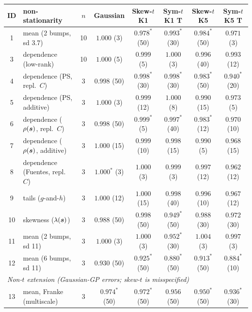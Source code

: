\setlength{\tabcolsep}{3.7pt}
\begin{tabular}{clcccccc}
\toprule
ID & non-stationarity & $n$ & Gaussian & Skew-$t$ K1 & Sym-$t$ K1 T & Skew-$t$ K5 & Sym-$t$ K5 T \\
\midrule
1 & mean (2 bumps, sd 3.7) & 10 & $1.000$ {\tiny(3)} & $0.978^{*}$ {\tiny(50)} & $0.993^{*}$ {\tiny(30)} & $0.984^{*}$ {\tiny(50)} & $0.971$ {\tiny(3)} \\
3 & dependence (low-rank) & 10 & $1.000$ {\tiny(5)} & $0.999$ {\tiny(5)} & $1.000$ {\tiny(3)} & $0.996$ {\tiny(40)} & $0.993$ {\tiny(12)} \\
4 & dependence (PS, repl.\ $C$) & 3 & $0.998$ {\tiny(50)} & $0.998^{*}$ {\tiny(30)} & $0.998^{*}$ {\tiny(30)} & $0.983^{*}$ {\tiny(50)} & $0.940^{*}$ {\tiny(20)} \\
5 & dependence (PS, additive) & 3 & $1.000$ {\tiny(3)} & $0.999$ {\tiny(12)} & $1.000$ {\tiny(8)} & $0.990$ {\tiny(15)} & $0.973$ {\tiny(5)} \\
6 & dependence ($\rho(\boldsymbol{s})$, repl.\ $C$) & 3 & $0.998$ {\tiny(50)} & $0.999^{*}$ {\tiny(5)} & $0.997^{*}$ {\tiny(40)} & $0.983^{*}$ {\tiny(12)} & $0.970$ {\tiny(10)} \\
7 & dependence ($\rho(\boldsymbol{s})$, additive) & 3 & $1.000$ {\tiny(15)} & $0.999$ {\tiny(10)} & $0.998$ {\tiny(15)} & $0.990$ {\tiny(5)} & $0.968$ {\tiny(15)} \\
8 & dependence (Fuentes, repl.\ $C$) & 3 & $1.000^{*}$ {\tiny(3)} & $1.000$ {\tiny(3)} & $0.999$ {\tiny(3)} & $0.997$ {\tiny(12)} & $0.962$ {\tiny(12)} \\
9 & tails ($g$-and-$h$) & 3 & $1.000$ {\tiny(12)} & $1.000$ {\tiny(15)} & $0.998$ {\tiny(40)} & $0.996$ {\tiny(10)} & $0.967$ {\tiny(12)} \\
10 & skewness ($\lambda(\boldsymbol{s})$) & 3 & $0.988$ {\tiny(50)} & $0.998$ {\tiny(50)} & $0.949^{*}$ {\tiny(50)} & $0.988$ {\tiny(30)} & $0.972$ {\tiny(30)} \\
11 & mean (2 bumps, sd 11) & 3 & $1.000$ {\tiny(3)} & $1.000$ {\tiny(3)} & $0.952^{*}$ {\tiny(30)} & $1.004$ {\tiny(3)} & $0.997$ {\tiny(3)} \\
12 & mean (6 bumps, sd 11) & 3 & $0.930$ {\tiny(50)} & $0.925^{*}$ {\tiny(50)} & $0.880^{*}$ {\tiny(50)} & $0.913^{*}$ {\tiny(50)} & $0.884^{*}$ {\tiny(10)} \\
\midrule
\multicolumn{8}{l}{\emph{Non-$t$ extension (Gaussian-GP errors; skew-$t$ is misspecified)}} \\
13 & mean, Franke (multiscale) & 3 & $0.974^{*}$ {\tiny(50)} & $0.972^{*}$ {\tiny(50)} & $0.956$ {\tiny(50)} & $0.950^{*}$ {\tiny(50)} & $0.936^{*}$ {\tiny(30)} \\

\end{tabular}
